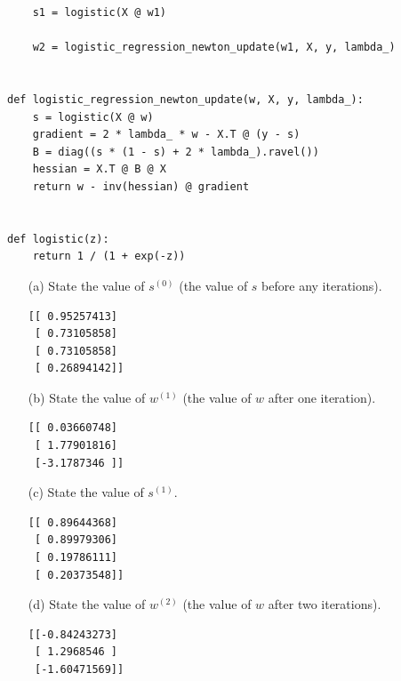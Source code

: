 \begin{enumerate}
\begin{mdframed}
\begin{verbatim}
    s1 = logistic(X @ w1)

    w2 = logistic_regression_newton_update(w1, X, y, lambda_)


def logistic_regression_newton_update(w, X, y, lambda_):
    s = logistic(X @ w)
    gradient = 2 * lambda_ * w - X.T @ (y - s)
    B = diag((s * (1 - s) + 2 * lambda_).ravel())
    hessian = X.T @ B @ X
    return w - inv(hessian) @ gradient


def logistic(z):
    return 1 / (1 + exp(-z))
  \end{verbatim}
\end{mdframed}

\begin{itemize}
\item[(a)]
State the value of $s^{(0)}$ (the value of $s$ before any iterations).

\begin{mdframed}
\begin{verbatim}
[[ 0.95257413]
 [ 0.73105858]
 [ 0.73105858]
 [ 0.26894142]]
\end{verbatim}
\end{mdframed}


\item[(b)]
State the value of $w^{(1)}$ (the value of $w$ after one iteration).
\begin{mdframed}
\begin{verbatim}
[[ 0.03660748]
 [ 1.77901816]
 [-3.1787346 ]]
\end{verbatim}
\end{mdframed}


\item[(c)]
State the value of $s^{(1)}$.
\begin{mdframed}
\begin{verbatim}
[[ 0.89644368]
 [ 0.89979306]
 [ 0.19786111]
 [ 0.20373548]]
\end{verbatim}
\end{mdframed}


\item[(d)]
State the value of $w^{(2)}$ (the value of $w$ after two iterations).
\begin{mdframed}
\begin{verbatim}
[[-0.84243273]
 [ 1.2968546 ]
 [-1.60471569]]
\end{verbatim}
\end{mdframed}

\end{itemize}
\end{enumerate}


